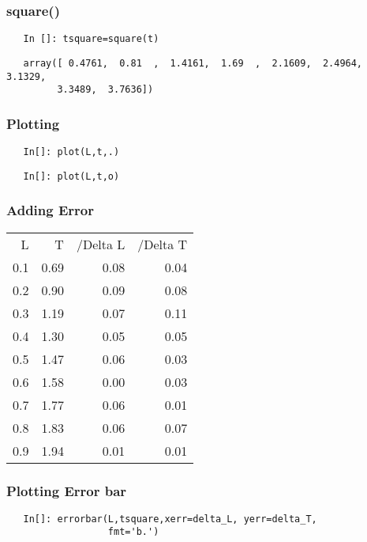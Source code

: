 \documentclass[presentation]{beamer}
\begin{document}
\begin{frame}[fragile]
\frametitle{square()}
\label{sec-5}

\begin{verbatim}
   In []: tsquare=square(t)
\end{verbatim}

  
\begin{verbatim}
   array([ 0.4761,  0.81  ,  1.4161,  1.69  ,  2.1609,  2.4964,  3.1329,
         3.3489,  3.7636])
\end{verbatim}


  
\end{frame}
\begin{frame}[fragile]
\frametitle{Plotting}
\label{sec-6}

\begin{verbatim}
   In[]: plot(L,t,.)
\end{verbatim}

  

\begin{verbatim}
   In[]: plot(L,t,o)
\end{verbatim}
\end{frame}
\begin{frame}
\frametitle{Adding Error}
\label{sec-7}




\begin{center}
\begin{tabular}{rrrr}
   L  &     T  &  /Delta L  &  /Delta T  \\
 0.1  &  0.69  &      0.08  &      0.04  \\
 0.2  &  0.90  &      0.09  &      0.08  \\
 0.3  &  1.19  &      0.07  &      0.11  \\
 0.4  &  1.30  &      0.05  &      0.05  \\
 0.5  &  1.47  &      0.06  &      0.03  \\
 0.6  &  1.58  &      0.00  &      0.03  \\
 0.7  &  1.77  &      0.06  &      0.01  \\
 0.8  &  1.83  &      0.06  &      0.07  \\
 0.9  &  1.94  &      0.01  &      0.01  \\
\end{tabular}
\end{center}


 
 
\end{frame}
\begin{frame}[fragile]
\frametitle{Plotting Error bar}
\label{sec-8}

  
\begin{verbatim}
   In[]: errorbar(L,tsquare,xerr=delta_L, yerr=delta_T,
                  fmt='b.')
\end{verbatim}
\end{frame}
\end{document}
